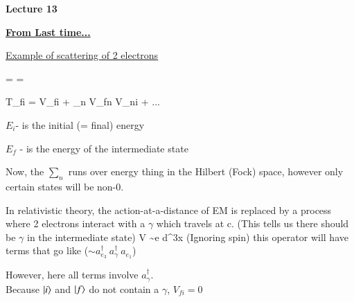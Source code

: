 
\usepackage{braket}
\usepackage{bbm}
\usepackage{relsize}
\usepackage{tcolorbox}



\usepackage{cancel}

\usepackage{fancyhdr}

\fancyhf{}


\thispagestyle{fancy}

\begin{center}
{\huge \textbf{Lecture 13}}
\end{center}

{\fontsize{14}{16}\selectfont

\textbf{\underline{From Last time...}} 

 
\underline{Example of scattering of 2 electrons}

\be
{} =  \hspace*{1in}   = 
\ee


\be
T_{fi} = V_{fi} + \sum_n V_{fn}  V_{ni} + ...
\ee

\bi
\item[-] $E_i$- is the initial (= final) energy
\item[-] $E_f$ - is the energy of the intermediate state
\ei

Now, the $\sum_n$ runs over energy thing in the Hilbert (Fock) space, however only certain states will be non-0.

In relativistic theory, the action-at-a-distance of EM is replaced by a process where 2 electrons interact with a $\gamma$ which travels at c. 
(This tells us there should be $\gamma$ in the intermediate state)
\be
V \sim e \int d^3x \psi \phi \psi  \hspace*{0.3in} \textrm{(Ignoring spin)}
\ee
this operator will have terms that go like ($\sim a_{e_3}^\dagger\ a_{\gamma}^\dagger\ a_{e_1}$)


However, here all terms involve $a_{\gamma}^\dagger$.\\
Because $\ket{i}$ and $\ket{f}$ do not contain a $\gamma$, $  V_{fi} = 0$

}
